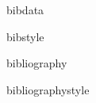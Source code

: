 \begin{docCommand}{bibdata}{}
\begin{docCommand}{bibstyle}{}
       \begin{teX}
\let\bibdata=\@gobble
\let\bibstyle=\@gobble
       \end{teX}
  \end{docCommand}
  \end{docCommand}


 \begin{docCommand}{bibliography}{}
 \end{docCommand}


 \begin{docCommand}{bibliographystyle}{}
 \end{docCommand}


